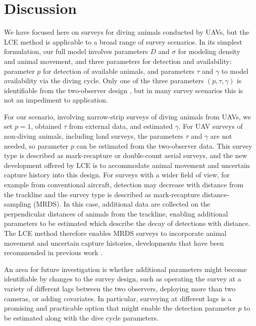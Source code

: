 \documentclass[useAMS, usenatbib, referee]{biom}\usepackage[]{graphicx}\usepackage[]{color}
\begin{document}
\section{Discussion\label{sec:discussion}}


We have focused here on surveys for diving animals conducted by UAVs, but the LCE method is applicable to a broad range of survey scenarios. In its simplest formulation, our full model involves parameters $D$ and $\sigma$ for modeling density and animal movement, and three parameters for detection and availability: parameter $p$ for detection of available animals, and parameters $\tau$ and $\gamma$ to model availability via the diving cycle. Only one of the three parameters $(p, \tau, \gamma)$ is identifiable from the two-observer design \citep{Stevenson+al:18}, but in many survey scenarios this is not an impediment to application.

For our scenario, involving narrow-strip surveys of diving animals from UAVs, we set $p=1$, obtained $\tau$ from external data, and estimated $\gamma$. For UAV surveys of non-diving animals, including land surveys, the parameters $\tau$ and $\gamma$ are not needed, so parameter $p$ can be estimated from the two-observer data. This survey type is described as mark-recapture or double-count aerial surveys, and the new development offered by LCE is to accommodate animal movement and uncertain capture history into this design. For surveys with a wider field of view, for example from conventional aircraft, detection may decrease with distance from the trackline and the survey type is described as mark-recapture distance-sampling (MRDS). In this case, additional data are collected on the perpendicular distances of animals from the trackline, enabling additional parameters to be estimated which describe the decay of detections with distance. The LCE method therefore enables MRDS surveys to incorporate animal movement and uncertain capture histories, developments that have been recommended in previous work \citep{Burt+al:14}.

An area for future investigation is whether additional parameters might become identifiable by changes to the survey design, such as operating the survey at a variety of different lags between the two observers, deploying more than two cameras, or adding covariates. In particular, surveying at different lags is a promising and practicable option that might enable the detection parameter $p$ to be estimated along with the dive cycle parameters.
\end{document}
